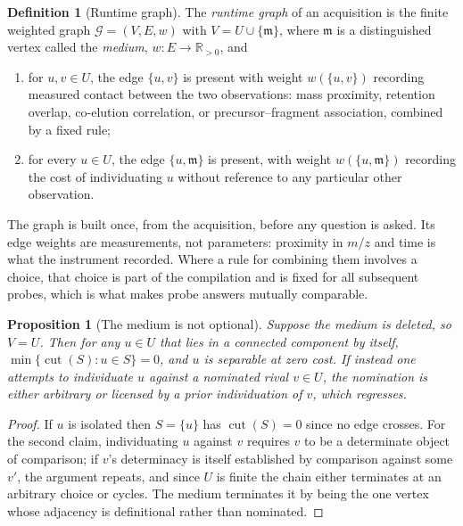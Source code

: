 \documentclass[11pt,a4paper]{article}
\newtheorem{proposition}[theorem]{Proposition}
\theoremstyle{definition}
\newtheorem{definition}[theorem]{Definition}
\theoremstyle{remark}
\newcommand{\Gph}{\mathcal{G}}
\newcommand{\wt}{w}
\newcommand{\med}{\mathfrak{m}}
\newcommand{\cut}{\operatorname{cut}}
\begin{document}
\begin{definition}[Runtime graph]\label{def:rtg}
The \emph{runtime graph} of an acquisition is the finite weighted graph
$\Gph = (V,E,\wt)$ with $V = U \cup \{\med\}$, where $\med$ is a
distinguished vertex called the \emph{medium}, $\wt : E \to
\mathbb{R}_{>0}$, and
\begin{enumerate}[label=(\alph*)]
\item for $u,v \in U$, the edge $\{u,v\}$ is present with weight
$\wt(\{u,v\})$ recording measured contact between the two observations:
mass proximity, retention overlap, co-elution correlation, or
precursor--fragment association, combined by a fixed rule;
\item for every $u \in U$, the edge $\{u,\med\}$ is present, with weight
$\wt(\{u,\med\})$ recording the cost of individuating $u$ without
reference to any particular other observation.
\end{enumerate}
\end{definition}

The graph is built once, from the acquisition, before any question is
asked. Its edge weights are measurements, not parameters: proximity in
$m/z$ and time is what the instrument recorded. Where a rule for
combining them involves a choice, that choice is part of the compilation
and is fixed for all subsequent probes, which is what makes probe answers
mutually comparable.

\begin{proposition}[The medium is not optional]\label{prop:medium}
Suppose the medium is deleted, so $V = U$. Then for any $u \in U$ that
lies in a connected component by itself, $\min\{\cut(S) : u \in S\} = 0$,
and $u$ is separable at zero cost. If instead one attempts to individuate
$u$ against a nominated rival $v \in U$, the nomination is either
arbitrary or licensed by a prior individuation of $v$, which regresses.
\end{proposition}

\begin{proof}
If $u$ is isolated then $S = \{u\}$ has $\cut(S) = 0$ since no edge
crosses. For the second claim, individuating $u$ against $v$ requires
$v$ to be a determinate object of comparison; if $v$'s determinacy is
itself established by comparison against some $v'$, the argument repeats,
and since $U$ is finite the chain either terminates at an arbitrary
choice or cycles. The medium terminates it by being the one vertex whose
adjacency is definitional rather than nominated.
\end{proof}
\end{document}
